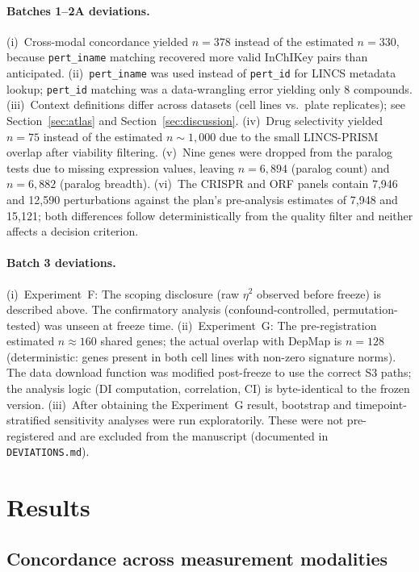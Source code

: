 \documentclass[11pt]{article}
\begin{document}
\paragraph{Batches 1--2A deviations.}
(i)~Cross-modal concordance yielded $n = 378$ instead of the estimated $n = 330$, because
\texttt{pert\_iname} matching recovered more valid InChIKey pairs than
anticipated.
(ii)~\texttt{pert\_iname} was used instead of \texttt{pert\_id} for
LINCS metadata lookup; \texttt{pert\_id} matching was a data-wrangling
error yielding only 8 compounds.
(iii)~Context definitions differ across datasets (cell lines vs.\ plate
replicates); see Section~\ref{sec:atlas} and Section~\ref{sec:discussion}.
(iv)~Drug selectivity yielded $n = 75$ instead of the estimated $n \sim 1{,}000$ due
to the small LINCS-PRISM overlap after viability filtering.
(v)~Nine genes were dropped from the paralog tests due to missing
expression values, leaving $n = 6{,}894$ (paralog count) and
$n = 6{,}882$ (paralog breadth).
(vi)~The CRISPR and ORF panels contain 7{,}946 and 12{,}590 perturbations
against the plan's pre-analysis estimates of 7{,}948 and 15{,}121; both
differences follow deterministically from the quality filter and neither
affects a decision criterion.

\paragraph{Batch 3 deviations.}
(i)~Experiment~F: The scoping disclosure (raw $\eta^2$ observed before
freeze) is described above.  The confirmatory analysis
(confound-controlled, permutation-tested) was unseen at freeze time.
(ii)~Experiment~G: The pre-registration estimated $n \approx 160$ shared
genes; the actual overlap with DepMap is $n = 128$ (deterministic:
genes present in both cell lines with non-zero signature norms).
The data download function was modified post-freeze to use the correct
S3 paths; the analysis logic (DI computation, correlation, CI) is
byte-identical to the frozen version.
(iii)~After obtaining the Experiment~G result, bootstrap and
timepoint-stratified sensitivity analyses were run exploratorily.
These were not pre-registered and are excluded from the manuscript
(documented in \texttt{DEVIATIONS.md}).


\section{Results}\label{sec:results}
\subsection{Concordance across measurement modalities}
\label{sec:concordance}
\end{document}

